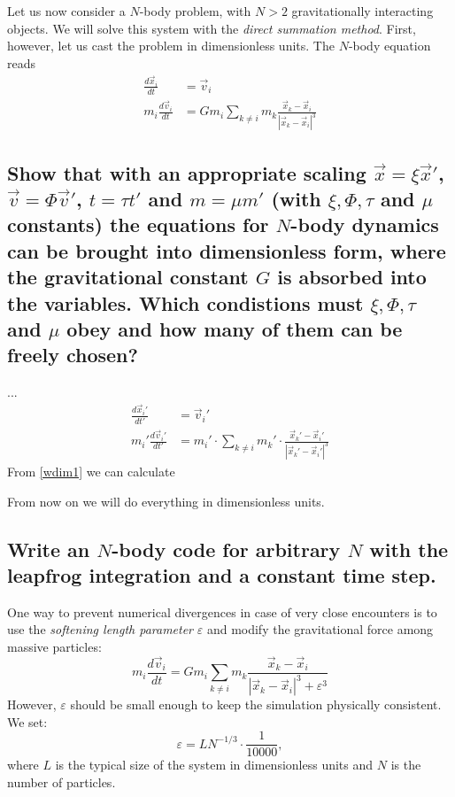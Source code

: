 Let us now consider a $N$-body problem, with $N>2$ gravitationally interacting
objects. We will solve this system with the \textit{direct summation method}.
First, however, let us cast the problem in dimensionless units. The $N$-body
equation reads
\begin{align}
    \frac{d\vec{x}_i}{dt}
    &=\vec{v}_i \\
    m_i\frac{d\vec{v}_i}{dt}
    &=Gm_i\sum_{k\neq i}m_k\frac{\vec{x}_k-\vec{x}_i}{|\vec{x}_k-\vec{x}_i|^3}
\end{align}

\subsection{Show that with an appropriate scaling $\vec x=\xi\vec x'$,
    $\vec v=\Phi\vec v'$, $t=\tau t'$ and $m=\mu m'$ (with $\xi,\Phi,\tau$
    and $\mu$ constants) the equations for $N$-body dynamics can be brought 
    into dimensionless form, where the gravitational constant $G$ is absorbed
    into the variables. Which condistions must $\xi,\Phi,\tau$ and $\mu$ obey
    and how many of them can be freely chosen?
}
    ...
    \begin{align}
        \frac{d\vec x_i'}{dt'}
        &=\vec v_i' \label{wdim1}\\
        m_i'\frac{d\vec v_i'}{dt'}
        &=m_i'\cdot\sum_{k\neq i}m_k'\cdot
        \frac{\vec x_k'-\vec x_i'}{|\vec x_k'-\vec x_i'|^3}
 		\label{wdim2}   
    \end{align}
    From \ref{wdim1} we can calculate 
    
    
    From now on we will do everything in dimensionless units.

\subsection{Write an $N$-body code for arbitrary $N$ with the leapfrog 
    integration and a constant time step.
} 
    One way to prevent numerical divergences in case of very close encounters 
    is to use the \textit{softening length parameter} $\varepsilon$ and modify 
    the gravitational force among massive particles:
    \begin{equation}
        m_i\frac{d\vec v_i}{dt}
        =Gm_i\sum_{k\neq i}m_k\frac{\vec x_k-\vec x_i}
        {|\vec x_k-\vec x_i|^3 + \varepsilon^3}
    \end{equation}
    However, $\varepsilon$ should be small enough to keep the simulation 
    physically consistent. We set:
    \begin{equation}
        \varepsilon=LN^{-1/3}\cdot\frac{1}{10000},
    \end{equation}
    where $L$ is the typical size of the system in dimensionless units and 
    $N$ is the number of particles.

